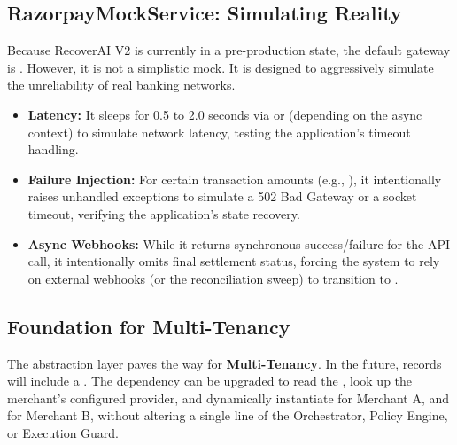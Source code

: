 \vspace{0.8cm}

\subsection{RazorpayMockService: Simulating Reality}

Because RecoverAI V2 is currently in a pre-production state, the default gateway is . However, it is not a simplistic  mock. It is designed to aggressively simulate the unreliability of real banking networks.

\begin{tcolorbox}[featurebox={Simulated Network Behaviors}]
\begin{itemize}
    \item \textbf{Latency:} It sleeps for 0.5 to 2.0 seconds via  or  (depending on the async context) to simulate network latency, testing the application's timeout handling.
    \item \textbf{Failure Injection:} For certain transaction amounts (e.g., ), it intentionally raises unhandled exceptions to simulate a 502 Bad Gateway or a socket timeout, verifying the application's  state recovery.
    \item \textbf{Async Webhooks:} While it returns synchronous success/failure for the API call, it intentionally omits final settlement status, forcing the system to rely on external webhooks (or the reconciliation sweep) to transition to .
\end{itemize}
\end{tcolorbox}

\vspace{0.8cm}

\subsection{Foundation for Multi-Tenancy}

The abstraction layer paves the way for \textbf{Multi-Tenancy}. In the future,  records will include a . The  dependency can be upgraded to read the , look up the merchant's configured provider, and dynamically instantiate  for Merchant A, and  for Merchant B, without altering a single line of the Orchestrator, Policy Engine, or Execution Guard.
